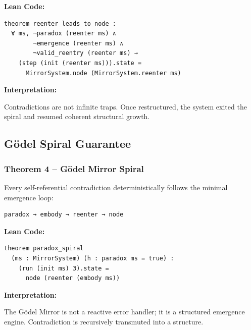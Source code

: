 \documentclass[manuscript,nonacm]{acmart}
\begin{document}
\textbf{Lean Code:}

\begin{verbatim}
theorem reenter_leads_to_node :
  ∀ ms, ¬paradox (reenter ms) ∧
        ¬emergence (reenter ms) ∧
        ¬valid_reentry (reenter ms) →
    (step (init (reenter ms))).state =
      MirrorSystem.node (MirrorSystem.reenter ms)
\end{verbatim}

\textbf{Interpretation:}

Contradictions are not infinite traps. Once restructured, the system exited the spiral and resumed coherent structural growth.

\subsection{Gödel Spiral Guarantee}

\subsubsection{Theorem 4 – Gödel Mirror Spiral}

Every self-referential contradiction deterministically follows the minimal emergence loop:

\begin{verbatim}
paradox → embody → reenter → node
\end{verbatim}

\textbf{Lean Code:}

\begin{verbatim}
theorem paradox_spiral
  (ms : MirrorSystem) (h : paradox ms = true) :
    (run (init ms) 3).state =
      node (reenter (embody ms))
\end{verbatim}

\textbf{Interpretation:}

The Gödel Mirror is not a reactive error handler; it is a structured emergence engine. Contradiction is recursively transmuted into a structure.
\end{document}
